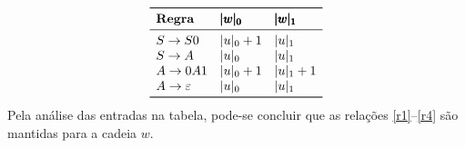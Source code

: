 \documentclass[12pt]{article}
\begin{document}
\begin{tcolorbox}
\begin{description}
		$$
		\begin{array}{lll}
   \toprule
		 \textbf{Regra} & \pmb{|w|_{0}} & \pmb{|w|_{1}}\\ 
 		\midrule
 		S \to S0       & |u|_{0} + 1 & |u|_{1}    \\ 
 		S \to A        & |u|_{0}     & |u|_{1}    \\ 
 		A \to 0A1      & |u|_{0} + 1 & |u|_{1} + 1 \\ 
 		A \to \varepsilon & |u|_{0}  & |u|_{1}     \\  
 		\bottomrule 
		\end{array} 
		$$
	Pela análise das entradas na tabela, pode-se concluir que as relações \ref{r1}--\ref{r4} são mantidas para a cadeia $w$.
 \end{description}
\end{tcolorbox}
\end{document}
